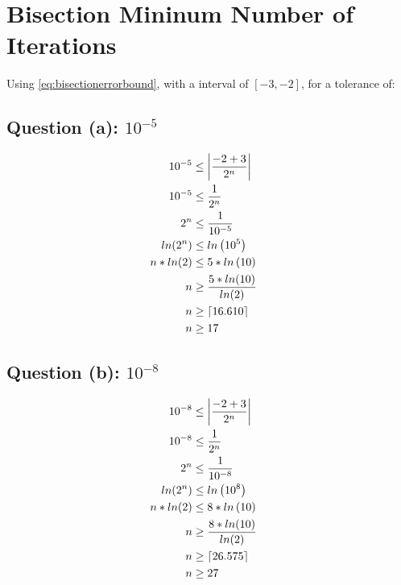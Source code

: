 \section{Bisection Mininum Number of Iterations}

Using \cref{eq:bisectionerrorbound}, with a interval of $[-3,-2]$, for a tolerance of:

\subsection{Question (a): $10^{-5}$}
	
	\begin{align}
		10^{-5} &\le \left|\frac{-2 + 3}{2^{n}}\right|& \notag \\
		10^{-5} &\le \frac{1}{2^{n}}& \notag \\
		2^{n} &\le \frac{1}{10^{-5}}& \notag \\
		ln(2^{n}) &\le ln\left(10^{5}\right)& \notag \\
		n*ln(2) &\le 5*ln\left(10\right)& \notag \\
		n &\ge \frac{5*ln(10)}{ln(2)}& \notag \\
		n &\ge \lceil 16.610 \rceil& \notag \\
		n &\ge 17& \notag \\
	\label{eq:37a}
	\end{align}
	

\subsection{Question (b): $10^{-8}$}

	\begin{align}
		10^{-8} &\le \left|\frac{-2 + 3}{2^{n}}\right|& \notag \\
		10^{-8} &\le \frac{1}{2^{n}}& \notag \\
		2^{n} &\le \frac{1}{10^{-8}}& \notag \\
		ln(2^{n}) &\le ln\left(10^{8}\right)& \notag \\
		n*ln(2) &\le 8*ln\left(10\right)& \notag \\
		n &\ge \frac{8*ln(10)}{ln(2)}& \notag \\
		n &\ge \lceil 26.575 \rceil& \notag \\
		n &\ge 27& \notag \\
	\label{eq:37a}
	\end{align}
